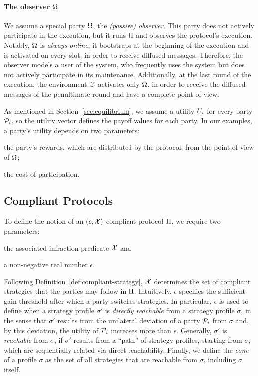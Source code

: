 \paragraph{The observer $\Omega$}
We assume a special party $\Omega$, the \emph{(passive)
observer}. This party does not actively participate in the execution, but it
runs $\Pi$ and observes the protocol's execution. Notably, $\Omega$ is
\emph{always online}, \ie it bootstraps at the beginning of the execution and
is activated on every slot, in order to receive diffused messages. Therefore,
the observer models a user of the system, who frequently uses the system but
does not actively participate in its maintenance. Additionally, at the last
round of the execution, the environment $\mathcal{Z}$ activates only $\Omega$, in
order to receive the diffused messages of the penultimate round and have a
complete point of view.

As mentioned in Section~\ref{sec:equilibrium}, we assume a utility $U_i$ for every party $\mathcal{P}_i$, so the utility vector defines the payoff values for
each party. In our examples, a party's utility depends on two parameters:
\begin{inparaenum}[i)]
    \item the party's rewards, which are distributed by the protocol, from the
        point of view of $\Omega$;
    \item the cost of participation.
\end{inparaenum}

\subsection{Compliant Protocols}\label{subsec:compliant}

To define the notion of an $(\epsilon, \mathcal{X})$-compliant protocol
$\Pi$, we require two parameters:
\begin{inparaenum}[(i)]
    \item the associated infraction predicate $\mathcal{X}$ and
    \item a non-negative real number $\epsilon$.
\end{inparaenum}
Following Definition~\ref{def:compliant-strategy}, $\mathcal{X}$
determines the set of compliant strategies that the parties may follow in
$\Pi$. Intuitively, $\epsilon$ specifies the sufficient gain threshold after which a party
switches strategies. In particular, $\epsilon$ is
used to define when a strategy profile $\sigma'$ is \emph{directly reachable}
from a strategy profile $\sigma$, in the sense that $\sigma'$ results from the
unilateral deviation of a party $\mathcal{P}_i$ from $\sigma$ and, by this
deviation, the utility of $\mathcal{P}_i$ increases more than $\epsilon$.
Generally, $\sigma'$ is \emph{reachable} from $\sigma$, if $\sigma'$ results
from a ``path'' of strategy profiles, starting from $\sigma$, which are
sequentially related via direct reachability. Finally, we define the \emph{cone}
of a profile $\sigma$ as the set of all strategies that are
reachable from $\sigma$, including $\sigma$ itself.

